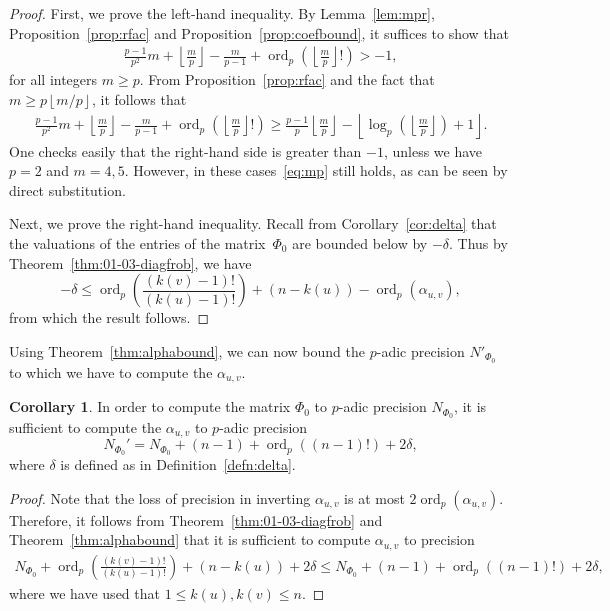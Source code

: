 \documentclass[a4paper,11pt]{article}
\numberwithin{equation}{section}
\providecommand{\floor}[1]{\left\lfloor#1\right\rfloor}   %
\DeclareMathOperator{\ord}{ord}          %
\theoremstyle{definition}
\newtheorem{cor}[thm]{Corollary}
\begin{document}
\begin{proof}
First, we prove the left-hand inequality. By Lemma~\ref{lem:mpr}, Proposition~\ref{prop:rfac} 
and Proposition~\ref{prop:coefbound}, it suffices to show that
\begin{align} \label{eq:mp}
\frac{p-1}{p^2}m + \floor{\frac{m}{p}}-\frac{m}{p-1} + \ord_p\left(\floor{\frac{m}{p}}!\right)>-1,
\end{align}
for all integers $m \geq p$. From Proposition~\ref{prop:rfac} and the fact that $m \geq p \floor{m/p}$, it follows that
\begin{align*}
\frac{p-1}{p^2}m + \floor{\frac{m}{p}}-\frac{m}{p-1} + \ord_p\left(\floor{\frac{m}{p}}!\right) \geq \frac{p-1}{p} \floor{\frac{m}{p}} - \floor{\log_p\left(\floor{\frac{m}{p}}\right)+1}.
\end{align*}
One checks easily that the right-hand side is greater than $-1$, unless we have $p=2$ and $m=4,5$. However, in these cases~\eqref{eq:mp} still holds, as can be seen by direct
substitution.

Next, we prove the right-hand inequality. Recall from Corollary~\ref{cor:delta} that the valuations 
of the entries of the matrix~$\Phi_0$ are bounded below by $-\delta$. Thus by Theorem~\ref{thm:01-03-diagfrob}, 
we have
\begin{equation*}
-\delta \leq \ord_p\left(\frac{(k(v) - 1)!}{(k(u) - 1)!} \right)+ (n-k(u)) - \ord_p( \alpha_{u,v}),
\end{equation*}
from which the result follows.
\end{proof}

Using Theorem~\ref{thm:alphabound}, we can now bound the $p$-adic precision $N'_{\Phi_0}$ to which we
have to compute the $\alpha_{u,v}$.

\begin{cor} \label{cor:NPhi0prime}
In order to compute the matrix $\Phi_0$ to $p$-adic precision $N_{\Phi_0}$, it is sufficient to
compute the $\alpha_{u,v}$ to $p$-adic precision 
\[
N_{\Phi_0}' = N_{\Phi_0} + (n-1) + \ord_p\left((n-1)!\right)  + 2\delta,
\]
where $\delta$ is defined as in Definition~\ref{defn:delta}.
\end{cor}

\begin{proof}
Note that the loss of precision in inverting $\alpha_{u,v}$ is at most $2\ord_p(\alpha_{u,v})$.
Therefore, it follows from Theorem~\ref{thm:01-03-diagfrob} and Theorem~\ref{thm:alphabound} that
it is sufficient to compute $\alpha_{u,v}$ to precision
\begin{align*}
N_{\Phi_0} + \ord_p\left(\frac{(k(v) - 1)!}{(k(u) - 1)!} \right) + (n-k(u)) + 2\delta \leq
N_{\Phi_0} + (n-1) + \ord_p\left((n-1)!\right)  + 2\delta,
\end{align*}
where we have used that $1 \leq k(u),k(v) \leq n$.
\end{proof}
\end{document}
